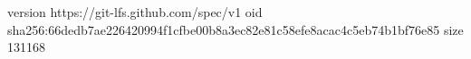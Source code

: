 version https://git-lfs.github.com/spec/v1
oid sha256:66dedb7ae226420994f1cfbe00b8a3ec82e81c58efe8acac4c5eb74b1bf76e85
size 131168
